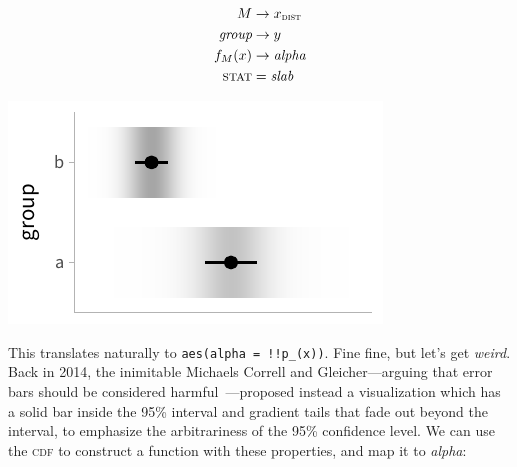 \documentclass[journal]{vgtc}              %
\begin{document}
\noindent
\begin{minipage}{.5\columnwidth}

\begin{align*}
M &\rightarrow x_\textsc{dist}\\
\textit{group} &\rightarrow y\\
f_M(x) &\rightarrow \textit{alpha}\\
\textsc{stat} &= \mathit{slab}
\end{align*}
\end{minipage}%
  \begin{minipage}{.4\columnwidth}
    \centering
    \includegraphics[width=1.2\columnwidth]{figs/3-slab_gradient_two_groups.pdf}
  \end{minipage}
\hfill\break

This translates naturally to \texttt{aes(alpha = !!p\_(x))}. Fine fine, but let's get \textit{weird}. Back in 2014, the inimitable Michaels Correll and Gleicher---arguing that error bars should be considered harmful~\cite{correll2014error}---proposed instead a visualization which has a solid bar inside the 95\% interval and gradient tails that fade out beyond the interval, to emphasize the arbitrariness of the 95\% confidence level. We can use the \textsc{cdf} to construct a function with these properties, and map it to \textit{alpha}:
\end{document}
